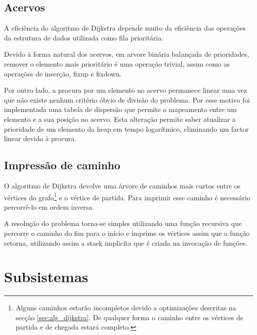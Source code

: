 \documentclass[portuguese, a4paper]{article}
\begin{document}
	\subsection{Acervos}
	\par
	A eficiência do algoritmo de Dijkstra depende muito da eficiência das
	operações da estrutura de dados utilizada como fila prioritária.
	\par
	Devido à forma natural dos acervos, em arvore binária balançada de
	prioridades, remover o elemento mais prioritário é uma operação trivial,
	assim como as operações de inserção, fixup e fixdown.
	\par
	Por outro lado, a procura por um elemento no acervo permanece linear uma
	vez que não existe nenhum critério óbvio de divisão do problema. Por esse
	motivo foi implementada uma tabela de dispersão que permite o
	mapeamento entre um elemento e a sua posição no acervo.  Esta alteração
	permite saber atualizar a prioridade de um elemento da heap em tempo
	logarítmico, eliminando um factor linear devido à procura.

	\subsection{Impressão de caminho}
	\par
	O algoritmo de Dijkstra devolve uma árvore de caminhos mais curtos entre os
	vértices do grafo\footnote{Alguns caminhos estarão incompletos devido a
	optimizações descritas na secção \ref{sec:alg_dijkstra}. De qualquer forma o
	caminho entre os vértices de partida e de chegada estará completo.} e o vértice
	de partida. Para imprimir esse caminho é necessário percorrê-lo em ordem
	inversa.
	\par
	A resolução do problema torna-se simples utilizando uma função
	recursiva que percorre o caminho do fim para o início e imprime os vértices
	assim que a função retorna, utilizando assim a stack implicíta que é criada
	na invocação de funções.


\section{Subsistemas}
\end{document}
